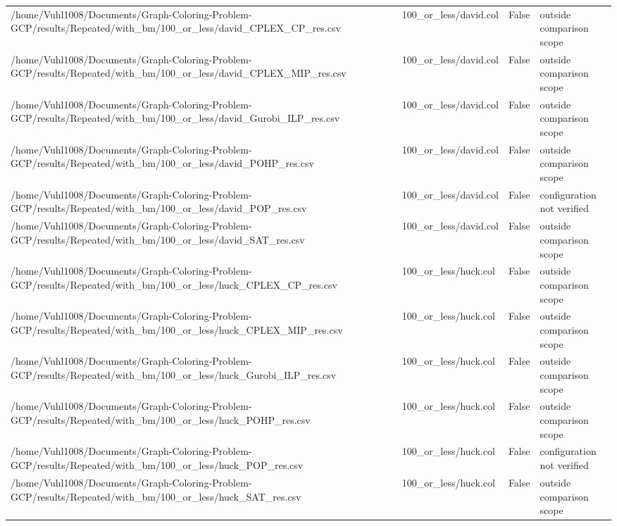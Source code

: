 \begin{table}[htbp]
\begin{tabular}{llll}
/home/Vuhl1008/Documents/Graph-Coloring-Problem-GCP/results/Repeated/with\_bm/100\_or\_less/david\_CPLEX\_CP\_res.csv & 100\_or\_less/david.col & False & outside comparison scope \\
/home/Vuhl1008/Documents/Graph-Coloring-Problem-GCP/results/Repeated/with\_bm/100\_or\_less/david\_CPLEX\_MIP\_res.csv & 100\_or\_less/david.col & False & outside comparison scope \\
/home/Vuhl1008/Documents/Graph-Coloring-Problem-GCP/results/Repeated/with\_bm/100\_or\_less/david\_Gurobi\_ILP\_res.csv & 100\_or\_less/david.col & False & outside comparison scope \\
/home/Vuhl1008/Documents/Graph-Coloring-Problem-GCP/results/Repeated/with\_bm/100\_or\_less/david\_POHP\_res.csv & 100\_or\_less/david.col & False & outside comparison scope \\
/home/Vuhl1008/Documents/Graph-Coloring-Problem-GCP/results/Repeated/with\_bm/100\_or\_less/david\_POP\_res.csv & 100\_or\_less/david.col & False & configuration not verified \\
/home/Vuhl1008/Documents/Graph-Coloring-Problem-GCP/results/Repeated/with\_bm/100\_or\_less/david\_SAT\_res.csv & 100\_or\_less/david.col & False & outside comparison scope \\
/home/Vuhl1008/Documents/Graph-Coloring-Problem-GCP/results/Repeated/with\_bm/100\_or\_less/huck\_CPLEX\_CP\_res.csv & 100\_or\_less/huck.col & False & outside comparison scope \\
/home/Vuhl1008/Documents/Graph-Coloring-Problem-GCP/results/Repeated/with\_bm/100\_or\_less/huck\_CPLEX\_MIP\_res.csv & 100\_or\_less/huck.col & False & outside comparison scope \\
/home/Vuhl1008/Documents/Graph-Coloring-Problem-GCP/results/Repeated/with\_bm/100\_or\_less/huck\_Gurobi\_ILP\_res.csv & 100\_or\_less/huck.col & False & outside comparison scope \\
/home/Vuhl1008/Documents/Graph-Coloring-Problem-GCP/results/Repeated/with\_bm/100\_or\_less/huck\_POHP\_res.csv & 100\_or\_less/huck.col & False & outside comparison scope \\
/home/Vuhl1008/Documents/Graph-Coloring-Problem-GCP/results/Repeated/with\_bm/100\_or\_less/huck\_POP\_res.csv & 100\_or\_less/huck.col & False & configuration not verified \\
/home/Vuhl1008/Documents/Graph-Coloring-Problem-GCP/results/Repeated/with\_bm/100\_or\_less/huck\_SAT\_res.csv & 100\_or\_less/huck.col & False & outside comparison scope \\

\end{tabular}
\end{table}
